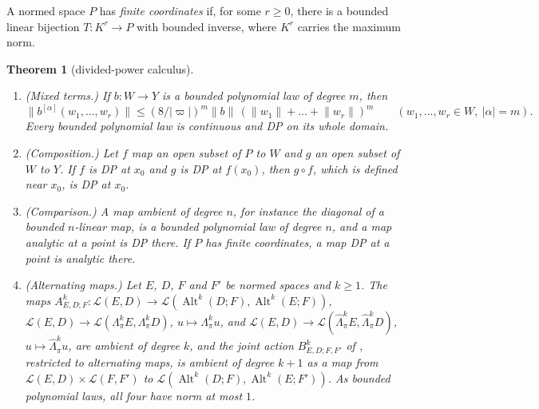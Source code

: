\documentclass[11pt]{amsart}
\newtheorem{theorem}{Theorem}[section]
\theoremstyle{definition}
\theoremstyle{remark}
\numberwithin{equation}{section}
\newcommand{\cL}{\mathcal L}
\newcommand{\Alt}{\operatorname{Alt}}
\newcommand{\abs}[1]{\lvert #1\rvert}
\newcommand{\norm}[1]{\lVert #1\rVert}
\theoremstyle{plain}
\theoremstyle{definition}
\theoremstyle{plain}
\begin{document}
A normed space $P$ has \emph{finite coordinates} if, for some $r\ge0$, there is a bounded linear bijection $T\colon K^r\to P$ with bounded inverse, where $K^r$ carries the maximum norm.

\begin{theorem}[divided-power calculus]\label{dp:thm:calculus}
\leavevmode
\begin{enumerate}
\item \textup{(Mixed terms.)} If $b\colon W\to Y$ is a bounded polynomial law of degree $m$, then
\[
 \norm{b^{[\alpha]}(w_1,\dots,w_r)}\le(8/\abs\varpi)^m\norm b\,(\norm{w_1}+\dots+\norm{w_r})^m
 \qquad(w_1,\dots,w_r\in W,\ \abs\alpha=m).
\]
Every bounded polynomial law is continuous and DP on its whole domain.
\item \textup{(Composition.)} Let $f$ map an open subset of $P$ to $W$ and $g$ an open subset of $W$ to $Y$. If $f$ is
DP at $x_0$ and $g$ is DP at $f(x_0)$, then $g\circ f$, which is defined near $x_0$, is DP at $x_0$.
\item \textup{(Comparison.)} A map ambient of degree $n$, for instance the diagonal of a bounded $n$\nobreakdash-linear
map, is a bounded polynomial law of degree $n$, and a map analytic at a point is DP there. If $P$ has finite
coordinates, a map DP at a point is analytic there.
\item \textup{(Alternating maps.)} Let $E$, $D$, $F$ and $F'$ be normed spaces and $k\ge1$. The maps
$A^k_{E,D;F}\colon\cL(E,D)\to\cL(\Alt^k(D;F),\Alt^k(E;F))$, $\cL(E,D)\to\cL(\Lambda^k_\pi E,\Lambda^k_\pi D)$,
$u\mapsto\Lambda^k_\pi u$, and $\cL(E,D)\to\cL(\widehat\Lambda^k_\pi E,\widehat\Lambda^k_\pi D)$,
$u\mapsto\widehat\Lambda^k_\pi u$, are ambient of degree $k$, and the joint action $B^k_{E,D;F,F'}$ of
\cite[Proposition~2.2]{I}, restricted to alternating maps, is ambient of degree $k+1$ as a map from
$\cL(E,D)\times\cL(F,F')$ to $\cL(\Alt^k(D;F),\Alt^k(E;F'))$. As bounded polynomial laws, all four have norm at most $1$.
\end{enumerate}
\end{theorem}
\end{document}
